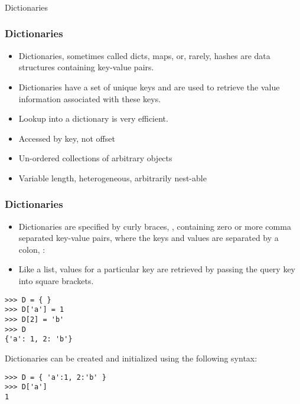 \begin{frame}[fragile]\frametitle{}
\begin{center}
{\Large Dictionaries}
\end{center}
\end{frame}


\begin{frame}[fragile]\frametitle{Dictionaries}
  \begin{itemize}
  \item Dictionaries, sometimes called dicts, maps, or, rarely, hashes are data structures containing key-value pairs. 
  \item Dictionaries have a set of unique keys and are used to retrieve the value information associated with these keys. 
  \item Lookup into a dictionary is very efficient. 
  \item Accessed by key, not offset
  \item Un-ordered collections of arbitrary objects
  \item Variable length, heterogeneous, arbitrarily nest-able
  \end{itemize}
\end{frame}


\begin{frame}[fragile]\frametitle{Dictionaries}
  \begin{itemize}
  \item Dictionaries are specified by curly braces, { }, containing zero or more comma separated key-value pairs, where the keys and values are separated by a colon, :
  \item Like a list, values for a particular key are retrieved by passing the query key into square brackets.
  \end{itemize}
\begin{lstlisting}
>>> D = { }
>>> D['a'] = 1
>>> D[2] = 'b'
>>> D
{'a': 1, 2: 'b'}
\end{lstlisting}

  
  Dictionaries can be created and initialized using the following syntax:
\begin{lstlisting}
>>> D = { 'a':1, 2:'b' }
>>> D['a']
1
\end{lstlisting}

\end{frame}

